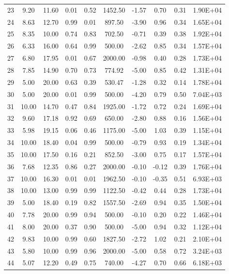 \begin{landscape}
\begin{center}
\begin{longtable}{|c|c|c|c|c|c|c|c|c|c|}
23 & 9.20  & 11.60 & 0.01 & 0.52 & 1452.50 & -1.57 & 0.70  & 0.31 & 1.90E+04 \\
24 & 8.63  & 12.70 & 0.99 & 0.01 & 897.50  & -3.90 & 0.96  & 0.34 & 1.65E+04 \\
25 & 8.35  & 10.00 & 0.74 & 0.83 & 702.50  & -0.71 & 0.39  & 0.38 & 1.92E+04 \\
26 & 6.33  & 16.00 & 0.64 & 0.99 & 500.00  & -2.62 & 0.85  & 0.34 & 1.57E+04 \\
27 & 6.80  & 17.95 & 0.01 & 0.67 & 2000.00 & -0.98 & 0.40  & 0.28 & 1.73E+04 \\
28 & 7.85  & 14.90 & 0.70 & 0.73 & 774.92  & -5.00 & 0.85  & 0.42 & 1.31E+04 \\
29 & 5.00  & 20.00 & 0.63 & 0.39 & 530.47  & -1.28 & 0.32  & 0.14 & 1.78E+04 \\
30 & 5.00  & 20.00 & 0.01 & 0.99 & 500.00  & -4.20 & 0.79  & 0.50 & 7.04E+03 \\
31 & 10.00 & 14.70 & 0.47 & 0.84 & 1925.00 & -1.72 & 0.72  & 0.24 & 1.69E+04 \\
32 & 9.60  & 17.18 & 0.92 & 0.69 & 650.00  & -2.80 & 0.88  & 0.16 & 1.56E+04 \\
33 & 5.98  & 19.15 & 0.06 & 0.46 & 1175.00 & -5.00 & 1.03  & 0.39 & 1.15E+04 \\
34 & 10.00 & 18.40 & 0.04 & 0.99 & 500.00  & -0.79 & 0.93  & 0.19 & 1.34E+04 \\
35 & 10.00 & 17.50 & 0.16 & 0.21 & 852.50  & -3.00 & 0.75  & 0.17 & 1.57E+04 \\
36 & 7.68  & 12.35 & 0.86 & 0.27 & 2000.00 & -0.10 & -0.12 & 0.39 & 1.76E+04 \\
37 & 10.00 & 16.30 & 0.01 & 0.01 & 1962.50 & -0.10 & -0.35 & 0.51 & 6.93E+03 \\
38 & 10.00 & 13.00 & 0.99 & 0.99 & 1122.50 & -0.42 & 0.44  & 0.28 & 1.73E+04 \\
39 & 5.00  & 18.40 & 0.19 & 0.82 & 1557.50 & -2.69 & 0.94  & 0.35 & 1.50E+04 \\
40 & 7.78  & 20.00 & 0.99 & 0.94 & 500.00  & -0.10 & 0.20  & 0.22 & 1.46E+04 \\
41 & 8.00  & 20.00 & 0.37 & 0.90 & 500.00  & -5.00 & 0.94  & 0.32 & 1.12E+04 \\
42 & 9.83  & 10.00 & 0.99 & 0.60 & 1827.50 & -2.72 & 1.02  & 0.21 & 2.10E+04 \\
43 & 5.80  & 10.00 & 0.99 & 0.96 & 2000.00 & -5.00 & 0.58  & 0.72 & 3.24E+03 \\
44 & 5.07  & 12.20 & 0.49 & 0.75 & 740.00  & -4.27 & 0.70  & 0.66 & 6.18E+03 \\

\end{longtable}
\end{center}
\end{landscape}
